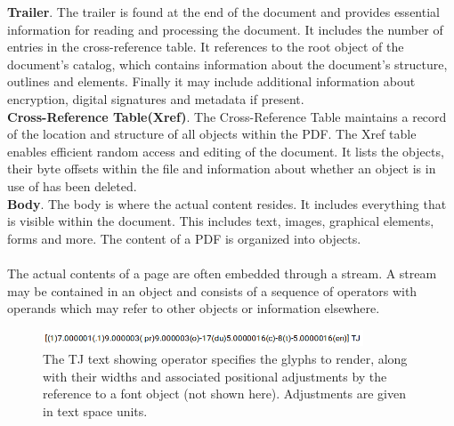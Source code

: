 \textbf{Trailer}. The trailer is found at the end of the document and provides essential information for reading and processing the document. It includes the number of entries in the cross-reference table. It references to the root object of the document's catalog, which contains information about the document's structure, outlines and elements. Finally it may include additional information about encryption, digital signatures and metadata if present. \\
\textbf{Cross-Reference Table(Xref)}. The Cross-Reference Table maintains a record of the location and structure of all objects within the PDF. The Xref table enables efficient random access and editing of the document. It lists the objects, their byte offsets within the file and information about whether an object is in use of has been deleted. \\
\textbf{Body}. The body is where the actual content resides. It includes everything that is visible within the document. This includes text, images, graphical elements, forms and more. The content of a PDF is organized into objects. 
\\\\
The actual contents of a page are often embedded through a stream. A stream may be contained in an object and consists of a sequence of operators with operands which may refer to other objects or information elsewhere.
\begin{figure}[h]
\includegraphics[width=0.85\textwidth]{latex/media/TJexample.png}
\centering
\caption{The TJ text showing operator specifies the glyphs to render, along with their widths and associated positional adjustments by the reference to a font object (not shown here). Adjustments are given in text space units. }
\label{fig:tjexample}
\end{figure}

